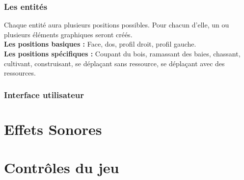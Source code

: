 \documentclass[a4paper]{article}
\newcommand{\alinea}{\hspace*{0.5cm}}
\begin{document}
    \section{Les entités}
      \alinea Chaque entité aura plusieurs positions possibles. Pour chacun d'elle, un ou plusieurs éléments graphiques seront créés.\\
      \textbf{Les positions basiques :} Face, dos, profil droit, profil gauche.\\
      \textbf{Les positions spécifiques :} Coupant du bois, ramassant des baies, chassant, cultivant, construisant, se déplaçant sans ressource, se déplaçant avec des ressources.
	
	\section{Interface utilisateur}
		

  \newpage
  \part{Effets Sonores}
  


  \newpage
  \part{Contrôles du jeu}
  
  
\end{document}
